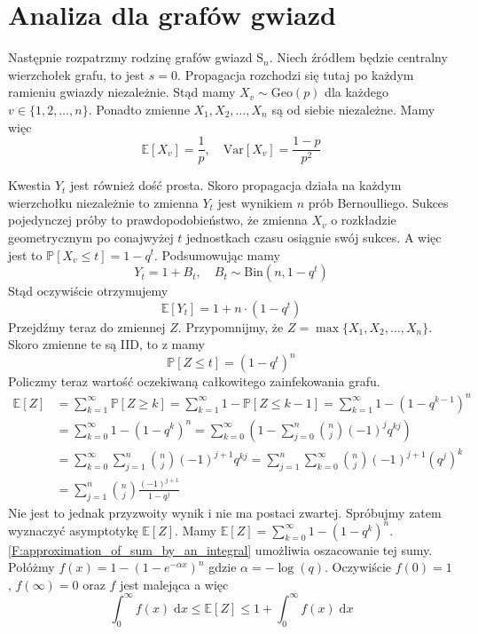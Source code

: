 \section{Analiza dla grafów gwiazd}

Następnie rozpatrzmy rodzinę grafów gwiazd $\mathrm{S}_n$. Niech źródłem będzie centralny wierzchołek grafu, to jest $s=0$. Propagacja rozchodzi się tutaj po każdym ramieniu gwiazdy niezależnie. Stąd mamy $X_v \sim \mathrm{Geo}(p)$ dla każdego $v\in\{1,2,\dots,n\}$. Ponadto zmienne $X_1,X_2,\dots,X_n$ są od siebie niezależne. Mamy więc
\[
    \mathbb{E}[X_v]=\frac{1}{p}, \quad \mathrm{Var}[X_v]=\frac{1-p}{p^2}
\]

Kwestia $Y_t$ jest również dość prosta. Skoro propagacja działa na każdym wierzchołku niezależnie to zmienna $Y_t$ jest wynikiem $n$ prób Bernoulliego. Sukces pojedynczej próby to prawdopodobieństwo, że zmienna $X_v$ o rozkładzie geometrycznym po conajwyżej $t$ jednostkach czasu osiągnie swój sukces. A więc jest to $\mathbb{P}[X_v\le t]=1-q^t$. Podsumowując mamy
\[
    Y_t = 1 + B_t, \quad B_t \sim \mathrm{Bin}(n, 1-q^t)
\]
Stąd oczywiście otrzymujemy 
\[
    \mathbb{E}[Y_t] = 1 + n\cdot (1-q^t)
\]
Przejdźmy teraz do zmiennej $Z$. Przypomnijmy, że $Z=\max\{X_1,X_2,\dots,X_n\}$. Skoro zmienne te są IID, to z  mamy 
\[
    \mathbb{P}[Z\le t] = (1-q^t)^n
\]
Policzmy teraz wartość oczekiwaną całkowitego zainfekowania grafu. 
\begin{align*}
\mathbb{E}[Z] 
&= \sum_{k=1}^{\infty} \mathbb{P}[Z\ge k] 
 = \sum_{k=1}^{\infty} 1 - \mathbb{P}[Z\le k-1]
 = \sum_{k=1}^{\infty}  1 - (1-q^{k-1})^n  \\
&= \sum_{k=0}^{\infty}  1 - (1-q^k)^n 
 = \sum_{k=0}^{\infty} \left( 1 - \sum_{j=0}^{n} \binom{n}{j} (-1)^j q^{kj} \right) \\
&= \sum_{k=0}^{\infty} \sum_{j=1}^{n} \binom{n}{j} (-1)^{j+1} q^{kj} = \sum_{j=1}^{n} \sum_{k=0}^{\infty} \binom{n}{j} (-1)^{j+1} (q^j)^k \\
&= \sum_{j=1}^{n} \binom{n}{j} \frac{(-1)^{j+1}}{1-q^j}
\end{align*}
Nie jest to jednak przyzwoity wynik i nie ma postaci zwartej. Spróbujmy zatem wyznaczyć asymptotykę $\mathbb{E}[Z]$. Mamy $\mathbb{E}[Z] = \sum_{k=0}^{\infty}  1 - (1-q^k)^n$. \cref{F:approximation_of_sum_by_an_integral} umożliwia oszacowanie tej sumy. Połóżmy $f(x) = 1 - (1 - e^{-\alpha x})^n$ gdzie $\alpha = -\log(q)$. Oczywiście $f(0)=1$ , $f(\infty)=0$ oraz $f$ jest malejąca a więc
\[
    \int_{0}^{\infty} f(x) \; \mathrm{d}x \le \mathbb{E}[Z] \le  1 + \int_{0}^{\infty} f(x) \; \mathrm{d}x
\]
